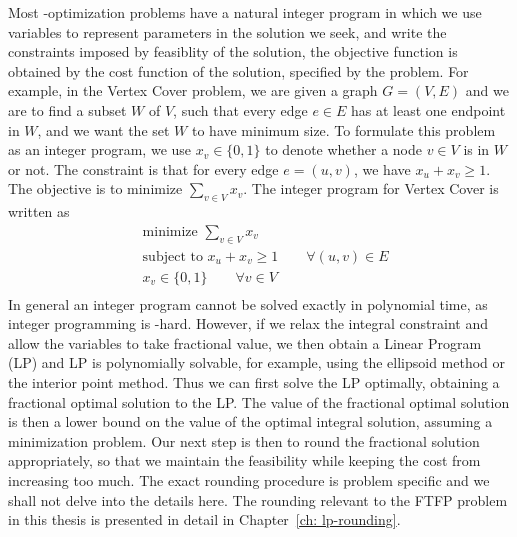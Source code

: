 \documentclass[oneside,final]{ucr}
\begin{document}
Most {\NP}-optimization problems have a natural integer
program in which we use variables to represent parameters in
the solution we seek, and write the constraints imposed by
feasiblity of the solution, the objective function is
obtained by the cost function of the solution, specified by
the problem. For example, in the Vertex Cover problem, we
are given a graph $G=(V,E)$ and we are to find a subset $W$
of $V$, such that every edge $e\in E$ has at least one
endpoint in $W$, and we want the set $W$ to have minimum
size. To formulate this problem as an integer program, we
use $x_v \in \{0,1\}$ to denote whether a node $v\in V$ is
in $W$ or not. The constraint is that for every edge
$e=(u,v)$, we have $x_u + x_v \geq 1$. The objective is to
minimize $\sum_{v\in V} x_v$. The integer program for Vertex
Cover is written as
\begin{align*}
  &\text{minimize } \sum_{v\in V} x_v\\
  &\text{subject to } x_u + x_v \geq 1  \qquad \forall (u,v) \in
  E\\
  &x_v \in \{0, 1\} \qquad \forall v \in V\\
\end{align*}
In general an integer program cannot be solved exactly in
polynomial time, as integer programming is
{\NP}-hard. However, if we relax the integral constraint and
allow the variables to take fractional value, we then obtain
a Linear Program (LP) and LP is polynomially solvable, for
example, using the ellipsoid method or the interior point
method. Thus we can first solve the LP optimally, obtaining
a fractional optimal solution to the LP. The value of the
fractional optimal solution is then a lower bound on the
value of the optimal integral solution, assuming a
minimization problem. Our next step is then to round the
fractional solution appropriately, so that we maintain the
feasibility while keeping the cost from increasing too
much. The exact rounding procedure is problem specific and
we shall not delve into the details here. The rounding
relevant to the FTFP problem in this thesis is presented in
detail in Chapter~\ref{ch: lp-rounding}.
\end{document}

